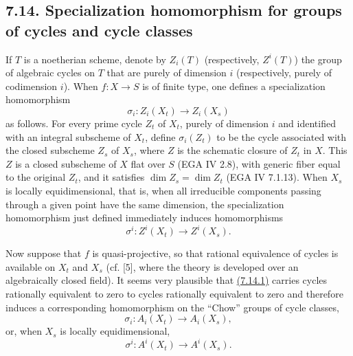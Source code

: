 \subsection*{7.14. Specialization homomorphism for groups of cycles and cycle classes}
If $T$ is a noetherian scheme, denote by $Z_i(T)$ (respectively, $Z^i(T)$)
the group of algebraic cycles on $T$ that are purely of dimension $i$
(respectively, purely of codimension $i$). When $f:X\to S$ is of finite type,
one defines
a specialization homomorphism
\begin{equation}\tag{7.14.1}
\sigma_i:Z_i(X_t)\longrightarrow Z_i(X_s)
\end{equation}
as follows. For every prime cycle $Z_t$ of $X_t$, purely of dimension $i$ and
identified with an integral subscheme of $X_t$, define $\sigma_i(Z_t)$ to be
the cycle associated with the closed subscheme $Z_s$ of $X_s$, where $Z$ is
the schematic closure of $Z_t$ in $X$. This $Z$ is a closed subscheme of $X$
flat over $S$ (EGA IV 2.8), with generic fiber equal to the original $Z_t$,
and it satisfies $\dim Z_s=\dim Z_t$ (EGA IV 7.1.13). When $X_s$ is locally
equidimensional, that is, when all irreducible components passing through a
given point have the same dimension, the specialization homomorphism just
defined immediately induces homomorphisms
\begin{equation}\tag{7.14.1 bis}
\sigma^i:Z^i(X_t)\longrightarrow Z^i(X_s).
\end{equation}

Now suppose that $f$ is quasi-projective, so that rational equivalence of
cycles is available on $X_t$ and $X_s$ (cf. [5], where the theory is
developed over an algebraically closed field). It seems very plausible that
\hyperlink{sga6.e10.eq.7-14-1}{(7.14.1)} carries cycles rationally equivalent to zero to cycles rationally
equivalent to zero and therefore induces a corresponding homomorphism on the
``Chow'' groups of cycle classes,
\begin{equation}\tag{7.14.2}
\sigma_i:A_i(X_t)\longrightarrow A_i(X_s),
\end{equation}
or, when $X_s$ is locally equidimensional,
\begin{equation}\tag{7.14.2 bis}
\sigma^i:A^i(X_t)\longrightarrow A^i(X_s).
\end{equation}

